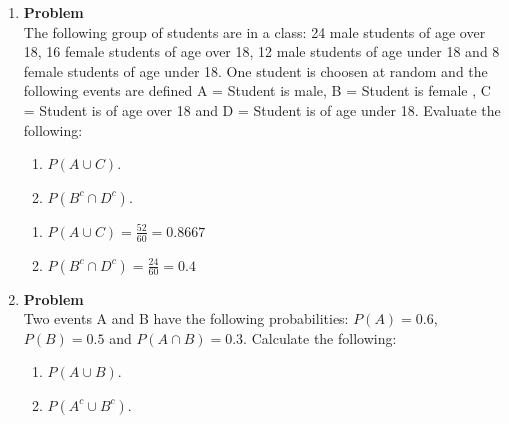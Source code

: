 \documentclass[12pt]{article}
\newenvironment{Ex}{\textbf{Problem}\vspace{.75em}\\}{}
\begin{document}
\begin{enumerate}
\begin{Ex}
\begin{solution}
\begin{figure}[hbt]
\begin{subfigure}[b]{0.45\textwidth}
          \resizebox{\textwidth}{!}{}
        \end{subfigure}
        \begin{subfigure}[b]{0.45\textwidth}
          \resizebox{\textwidth}{!}{}
        \end{subfigure}
        \begin{subfigure}[b]{0.45\textwidth}
          \resizebox{\textwidth}{!}{}
        \end{subfigure}
        \begin{subfigure}[b]{0.45\textwidth}
          \resizebox{\textwidth}{!}{}
        \end{subfigure}
        \caption{Plots for Problem 2}
        \label{fig:2-plots}
      \end{figure}
    \end{solution}
  \end{Ex}
\item 
  \begin{Ex}
    The following group of students are in a class: 24 male students
    of age over 18, 16 female students of age over 18, 12 male
    students of age under 18 and 8 female students of age under
    18. One student is choosen at random and the following events are
    defined A = Student is male, B = Student is female , C = Student is
    of age over 18 and D = Student is of age under 18. Evaluate the
    following:
    \begin{enumerate}
    \item $P(A \cup C)$.
    \item $P(B^c \cap D^c)$.
    \end{enumerate}
    \begin{solution} \hfill
      \begin{enumerate}
      \item $P(A \cup C) = \frac{52}{60} = 0.8667$
      \item $P(B^c \cap D^c) = \frac{24}{60} = 0.4$
      \end{enumerate}
    \end{solution}
  \end{Ex}
\item 
  \begin{Ex}
    Two events A and B have the following probabilities: $P(A) = 0.6$,
    $P(B) = 0.5$ and $P(A \cap B) = 0.3$. Calculate the following:
    \begin{enumerate}
    \item $P(A \cup B)$.
    \item $P(A^c \cup B^c)$.

\end{enumerate}
\end{Ex}
\end{enumerate}
\end{document}
